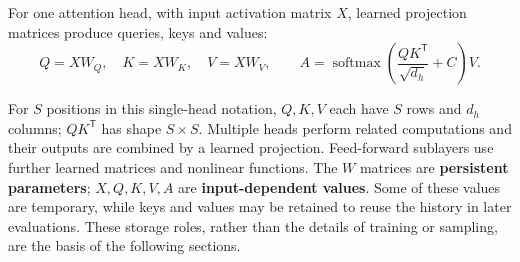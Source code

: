 \begin{samepage}
For one attention head, with input activation matrix \(X\), learned
projection matrices produce queries, keys and values:
\begin{equation}
\label{eq:scaled-dot-product-attention}
 Q=XW_Q,\quad K=XW_K,\quad V=XW_V,\qquad
 A=\operatorname{softmax}\!\left(\frac{QK^{\mathsf T}}{\sqrt{d_h}}+C\right)V.
\end{equation}
\end{samepage}

For \(S\) positions in this single-head notation, \(Q,K,V\) each have
\(S\) rows and \(d_h\) columns; \(QK^{\mathsf T}\) has shape \(S\times S\).
Multiple heads perform related computations and their outputs are
combined by a learned projection.  Feed-forward sublayers use further
learned matrices and nonlinear functions.  The \(W\) matrices are
\textbf{persistent parameters}; \(X,Q,K,V,A\) are \textbf{input-dependent
values}.  Some of these values are temporary, while keys and values
may be retained to reuse the history in later evaluations.  These
storage roles, rather than the details of training or sampling, are the
basis of the following sections.
\FloatBarrier
